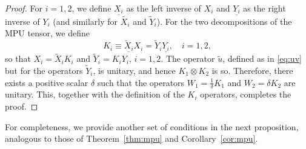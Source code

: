 \documentclass[reprint,
superscriptaddress,
amsmath,amssymb,
notitlepage,
aps,
prb,
10pt, 
tightenlines
]{revtex4-2}
\begin{document}
\begin{proof}
For $i=1,2$, we define $\underline{X_i}$ as the left inverse of $X_i$ and $\underline{Y_i}$ as the right inverse of $Y_i$ (and similarly for $\widetilde{X_i}$ and $\widetilde{Y}_i$). For the two decompositions of the MPU tensor, we define 
\begin{equation}
    K_i\equiv \underline{\widetilde{X}_i}X_i=\widetilde{Y}_i \underline{Y_i}, \quad i=1,2,
\end{equation}
so that $X_i=\widetilde{X}_i K_i$ and $\widetilde{Y}_i=K_i Y_i$, $i=1,2$. The operator $\widetilde{u}$, defined as in \eqref{eq:uv} but for the operators $\widetilde{Y}_i$, is unitary, and hence $K_1\otimes K_2$ is so. Therefore, there exists a positive scalar $\delta$ such that the operators $W_1=\frac{1}{\delta}K_1$ and $W_2=\delta K_2$ are unitary. This, together with the definition of the $K_i$ operators, completes the proof.
\end{proof}
For completeness, we provide another set of conditions in the next proposition, analogous to those of Theorem~\ref{thm:mpu} and Corollary~\ref{cor:mpu}. 
\end{document}
